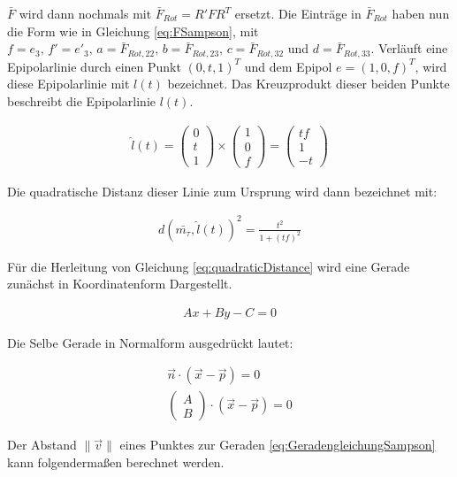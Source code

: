 $\bar{F}$ wird dann nochmals mit $\bar{F}_{Rot} = R'FR^T$ ersetzt. Die Einträge in $\bar{F}_{Rot}$ haben nun die Form wie in Gleichung \ref{eq:FSampson}, mit $f = e_3, \, f' = e'_3, \, a = \bar{F}_{Rot,22}, \, b = \bar{F}_{Rot,23}, \, c = \bar{F}_{Rot,32}$ und $d = \bar{F}_{Rot,33}$.
Verläuft eine Epipolarlinie durch einen Punkt $(0,t,1)^T$ und dem Epipol $e = (1,0,f)^T$, wird diese Epipolarlinie mit $l(t)$ bezeichnet. Das Kreuzprodukt dieser beiden Punkte beschreibt die Epipolarlinie $l(t)$. 

\begin{gather}
\hat{l}(t)=
	\begin{pmatrix}
	0\\t\\1
	\end{pmatrix} \times
	\begin{pmatrix}
	1\\0\\f
	\end{pmatrix} = 
	\begin{pmatrix}
	tf\\1\\-t
	\end{pmatrix}
\end{gather}

Die quadratische Distanz dieser Linie zum Ursprung wird dann bezeichnet mit:


\begin{gather}
	d(\bar{m_\tau},\hat{l}(t))^2 = \frac{t^2}{1+(tf)^2} \label{eq:quadraticDistance}
\end{gather}

Für die Herleitung von Gleichung \ref{eq:quadraticDistance} wird eine Gerade zunächst in Koordinatenform Dargestellt.

\begin{gather}
	Ax+By-C = 0
\end{gather}

Die Selbe Gerade in Normalform ausgedrückt lautet:

\begin{gather}
\vec{n}\cdot (\vec{x} - \vec{p}) = 0\\
	\begin{pmatrix}
	A\\B
	\end{pmatrix}
	\cdot
	(\vec{x} - \vec{p}) = 0\label{eq:GeradengleichungSampson}
\end{gather} 

Der Abstand $\parallel \vec{v} \parallel$ eines Punktes zur Geraden \ref{eq:GeradengleichungSampson} kann folgendermaßen berechnet werden.


